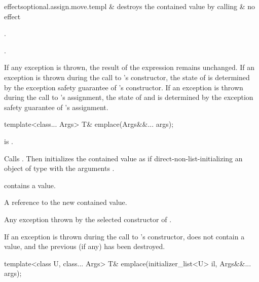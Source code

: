 \begin{itemdescr}
\begin{lib2dtab2}{ effects}{optional.assign.move.templ}
 &
destroys the contained value by calling  &
no effect \\
\end{lib2dtab2}

\pnum
\ensures
{}.

\pnum
\returns
{}.

\pnum
\remarks
If any exception is thrown,
the result of the expression  remains unchanged.
If an exception is thrown during the call to 's constructor,
the state of  is determined by
the exception safety guarantee of 's constructor.
If an exception is thrown during the call to 's assignment,
the state of  and  is determined by
the exception safety guarantee of 's assignment.
\end{itemdescr}

%
\begin{itemdecl}
template<class... Args> T& emplace(Args&&... args);
\end{itemdecl}

\begin{itemdescr}
\pnum
\mandates
{} is .

\pnum
\effects
Calls . Then initializes the contained value as if direct-non-list-initializing an object of type  with the arguments .

\pnum
\ensures
{} contains a value.

\pnum
\returns
A reference to the new contained value.

\pnum
\throws
Any exception thrown by the selected constructor of .

\pnum
\remarks
If an exception is thrown during the call to 's constructor,  does not contain a value, and the previous  (if any) has been destroyed.
\end{itemdescr}

%
\begin{itemdecl}
template<class U, class... Args> T& emplace(initializer_list<U> il, Args&&... args);
\end{itemdecl}

